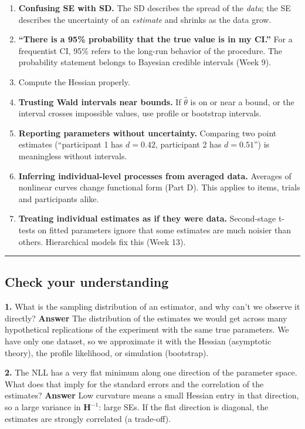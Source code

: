 \begin{enumerate}
\def\labelenumi{\arabic{enumi}.}
\tightlist
\item
  \textbf{Confusing SE with SD.} The SD describes the spread of the
  \emph{data}; the SE describes the uncertainty of an \emph{estimate}
  and shrinks as the data grow.
\item
  \textbf{``There is a 95\% probability that the true value is in my
  CI.''} For a frequentist CI, 95\% refers to the long-run behavior of
  the procedure. The probability statement belongs to Bayesian credible
  intervals (Week 9).
\item
  Compute the Hessian properly.
\item
  \textbf{Trusting Wald intervals near bounds.} If \(\hat\theta\) is on
  or near a bound, or the interval crosses impossible values, use
  profile or bootstrap intervals.
\item
  \textbf{Reporting parameters without uncertainty.} Comparing two point
  estimates (``participant 1 has \(d = 0.42\), participant 2 has
  \(d = 0.51\)'') is meaningless without intervals.
\item
  \textbf{Inferring individual-level processes from averaged data.}
  Averages of nonlinear curves change functional form (Part D). This
  applies to items, trials and participants alike.
\item
  \textbf{Treating individual estimates as if they were data.}
  Second-stage t-tests on fitted parameters ignore that some estimates
  are much noisier than others. Hierarchical models fix this (Week 13).
\end{enumerate}

\begin{center}\rule{0.5\linewidth}{0.5pt}\end{center}

\subsection{Check your understanding}

\textbf{1.} What is the sampling distribution of an estimator, and why
can't we observe it directly? \textbf{Answer} The distribution of the
estimates we would get across many hypothetical replications of the
experiment with the same true parameters. We have only one dataset, so
we approximate it with the Hessian (asymptotic theory), the profile
likelihood, or simulation (bootstrap).

\textbf{2.} The NLL has a very flat minimum along one direction of the
parameter space. What does that imply for the standard errors and the
correlation of the estimates? \textbf{Answer} Low curvature means a
small Hessian entry in that direction, so a large variance in
\(\mathbf{H}^{-1}\): large SEs. If the flat direction is diagonal, the
estimates are strongly correlated (a trade-off).

